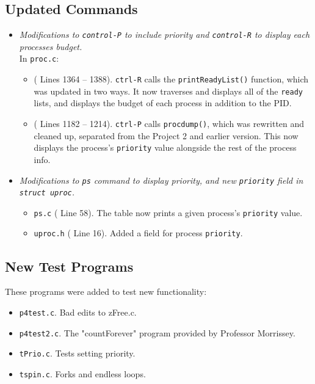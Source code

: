 \documentclass[11pt,letterpaper]{report}
\begin{document}
	\subsection{Updated Commands}
	\begin{itemize}
		\item \emph{Modifications to {\tt control-P} to include priority and {\tt control-R} to display each processes budget.}\\
		In {\tt proc.c}:
		\begin{itemize}
			\item ({\color{red} Lines 1364 -- 1388}). {\tt ctrl-R} calls the {\tt printReadyList()} function, which was updated in two ways. It now traverses and displays all of the {\tt ready} lists, and displays the budget of each process in addition to the PID.
			
			\item ({\color{red} Lines 1182 -- 1214}). {\tt ctrl-P} calls {\tt procdump()}, which was rewritten and cleaned up, separated from the Project 2 and earlier version. This now displays the process's {\tt priority} value alongside the rest of the process info.
		\end{itemize}
		
		\item \emph{Modifications to {{\tt ps} command to display priority, and new {\tt priority} field in {\tt struct uproc}.}}
		\begin{itemize}
			\item {\tt ps.c} ({\color{red} Line 58}). The table now prints a given process's {\tt priority} value.
			\item {\tt uproc.h} ({\color{red} Line 16}). Added a field for process {\tt priority}.
		\end{itemize}
	
	\end{itemize}
	
	\subsection{New Test Programs}
	These programs were added to test new functionality:
	\begin{itemize}
		\item {\tt p4test.c}. Bad edits to {zFree.c}.
		\item {\tt p4test2.c}. The "countForever" program provided by Professor Morrissey.
		\item {\tt tPrio.c}. Tests setting priority.
		\item {\tt tspin.c}. Forks and endless loops.
	\end{itemize}
		
\end{document}
